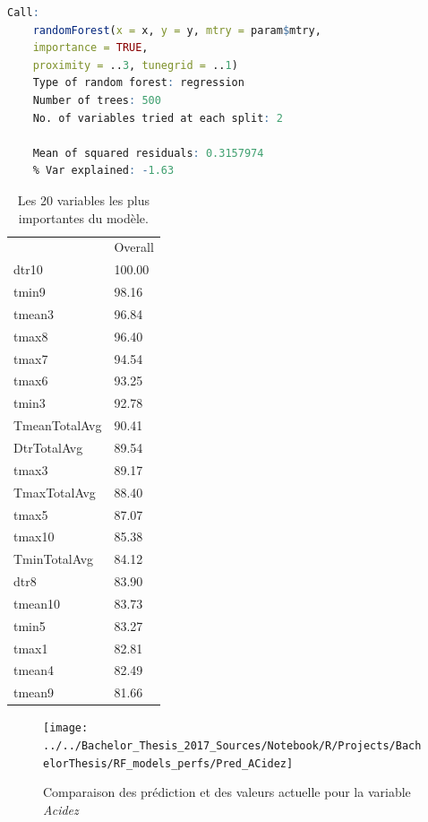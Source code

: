 \begin{minipage}{\linewidth}
	
	\begin{lstlisting}[showstringspaces=false,language=R, caption={Test du modèle de classification},captionpos=b]
	Call:
	randomForest(x = x, y = y, mtry = param$mtry, 
	importance = TRUE,      
	proximity = ..3, tunegrid = ..1) 
	Type of random forest: regression
	Number of trees: 500
	No. of variables tried at each split: 2
	
	Mean of squared residuals: 0.3157974
	% Var explained: -1.63
	\end{lstlisting}
\end{minipage}


\begin{table}[H]
	\centering
	\caption{Les 20 variables les plus importantes du modèle.}
	\label{RF_Acidez_Varimp}
	\begin{tabular}{ll}
	 & Overall \\
	 dtr10         & 100.00  \\
	 tmin9         & 98.16   \\
	 tmean3        & 96.84   \\
	 tmax8         & 96.40   \\
	 tmax7         & 94.54   \\
	 tmax6         & 93.25   \\
	 tmin3         & 92.78   \\
	 TmeanTotalAvg & 90.41   \\
	 DtrTotalAvg   & 89.54   \\
	 tmax3         & 89.17   \\
	 TmaxTotalAvg  & 88.40   \\
	 tmax5         & 87.07   \\
	 tmax10        & 85.38   \\
	 TminTotalAvg  & 84.12   \\
	 dtr8          & 83.90   \\
	 tmean10       & 83.73   \\
	 tmin5         & 83.27   \\
	 tmax1         & 82.81   \\
	 tmean4        & 82.49   \\
	 tmean9        & 81.66  
	\end{tabular}
\end{table}

\begin{figure}[H]
	\centering
	\texttt{[image: ../../Bachelor\_Thesis\_2017\_Sources/Notebook/R/Projects/BachelorThesis/RF\_models\_perfs/Pred\_ACidez]}
	\caption{Comparaison des prédiction et des valeurs actuelle pour la variable \textit{Acidez}}
	\label{fig:predacidez}
\end{figure}


